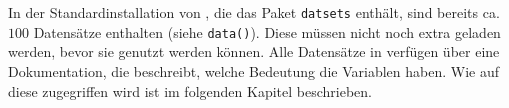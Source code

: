 
In der Standardinstallation von \R{}, die das Paket \verb!datsets! enthält, sind bereits ca. $100$ Datensätze enthalten (siehe \verb!data()!). Diese müssen nicht noch extra geladen werden, bevor sie genutzt werden können. Alle Datensätze in \R{} verfügen über eine Dokumentation, die beschreibt, welche Bedeutung die Variablen haben. Wie auf diese zugegriffen wird ist im folgenden Kapitel beschrieben.



 
 


